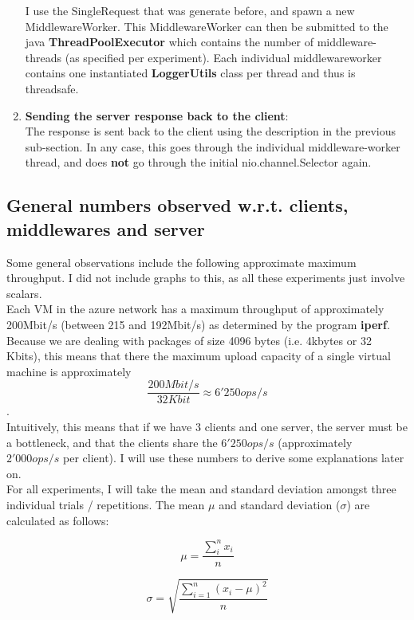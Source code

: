 \documentclass[11pt,a4paper]{article}
\begin{document}
\begin{enumerate}
I use the SingleRequest that was generate before, and spawn a new MiddlewareWorker.
This MiddlewareWorker can then be submitted to the java \textbf{ThreadPoolExecutor} which contains the number of middleware-threads (as specified per experiment).
Each individual middlewareworker contains one instantiated \textbf{LoggerUtils} class per thread and thus is threadsafe.
\item \textbf{Sending the server response back to the client}: \\
The response is sent back to the client using the description in the previous sub-section.
In any case, this goes through the individual middleware-worker thread, and does \textbf{not} go through the initial nio.channel.Selector again.
\end{enumerate}

\subsection{General numbers observed w.r.t. clients, middlewares and server}
Some general observations include the following approximate maximum throughput. 
I did not include graphs to this, as all these experiments just involve scalars. \\

Each VM in the azure network has a maximum throughput of approximately 200Mbit/s (between 215 and 192Mbit/s) as determined by the program \textbf{iperf}.
Because we are dealing with packages of size 4096 bytes (i.e. 4kbytes or 32 Kbits), this means that there the maximum upload capacity of a single virtual machine is approximately $$ \frac{200Mbit/s}{32Kbit} \approx 6'250 ops/s$$.\\

Intuitively, this means that if we have 3 clients and one server, the server must be a bottleneck, and that the clients share the $6'250 ops/s$ (approximately $2'000ops/s$ per client).
I will use these numbers to derive some explanations later on.\\

For all experiments, I will take the mean and standard deviation amongst three individual trials / repetitions.
The mean $\mu$ and standard deviation ($\sigma$) are calculated as follows:

\begin{equation}
\mu = \frac{\sum_i^n x_i} {n}
\end{equation}

\begin{equation}
\sigma = \sqrt{ \frac{\displaystyle\sum_{i=1}^{n}(x_i - \mu)^2} {n} }
\end{equation}
\end{document}
